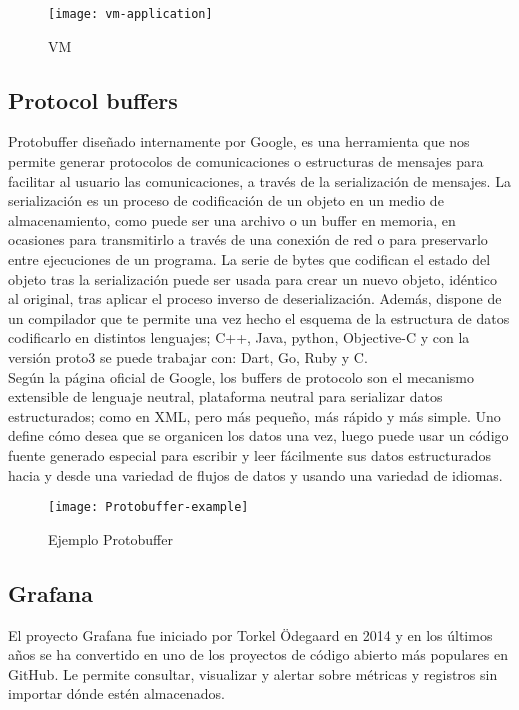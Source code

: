 \documentclass[ spanish, a4paper, 12pt, oneside]{report}
\begin{document}
\begin{figure}[!h]
   \centering
   \texttt{[image: vm-application]}\\
      \caption{\label{fig: vm} VM}
\end{figure}



\subsection{Protocol buffers}
Protobuffer diseñado internamente por Google, es una herramienta que nos permite generar protocolos de comunicaciones o estructuras de mensajes para facilitar al usuario las comunicaciones, a través de la serialización de mensajes.
La serialización es un proceso de codificación de un objeto en un medio de almacenamiento, como puede ser una archivo o un buffer en memoria, en ocasiones para transmitirlo a través de una conexión de red o para preservarlo entre ejecuciones 
de un programa. La serie de bytes que codifican el estado del objeto tras la serialización puede ser usada para crear un nuevo objeto, idéntico al original, tras aplicar el proceso inverso de deserialización. Además, dispone de un compilador que 
te permite una vez hecho el esquema de la estructura de datos codificarlo en distintos lenguajes; C++, Java, python, Objective-C y con la versión proto3 se puede trabajar con: Dart, Go, Ruby y C. \\ 

Según la página oficial de Google, los buffers de protocolo son el mecanismo extensible de lenguaje neutral, plataforma neutral para serializar datos estructurados; como en XML, pero más pequeño, más rápido y más simple. Uno define cómo desea que se 
organicen los datos una vez, luego puede usar un código fuente generado especial para escribir y leer fácilmente sus datos estructurados hacia y desde una variedad de flujos de datos y usando una variedad de idiomas. \\

\begin{figure}[!h]
   \centering
   \texttt{[image: Protobuffer-example]}\\
      \caption{\label{fig: Protobuffer example} Ejemplo Protobuffer}
\end{figure}

\subsection{Grafana}
El proyecto Grafana fue iniciado por Torkel Ödegaard en 2014 y en los últimos años se ha convertido en uno de los proyectos de código abierto más populares en GitHub. Le permite consultar, visualizar y alertar sobre métricas y registros sin importar 
dónde estén almacenados. \\
\end{document}
